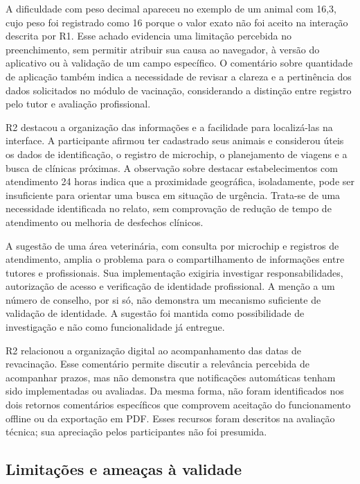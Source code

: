 \documentclass{UNESC}
\begin{document}
A dificuldade com peso decimal apareceu no exemplo de um animal com 16,3, cujo peso foi registrado como 16 porque o valor exato não foi aceito na interação descrita por R1. Esse achado evidencia uma limitação percebida no preenchimento, sem permitir atribuir sua causa ao navegador, à versão do aplicativo ou à validação de um campo específico. O comentário sobre quantidade de aplicação também indica a necessidade de revisar a clareza e a pertinência dos dados solicitados no módulo de vacinação, considerando a distinção entre registro pelo tutor e avaliação profissional.

R2 destacou a organização das informações e a facilidade para localizá-las na interface. A participante afirmou ter cadastrado seus animais e considerou úteis os dados de identificação, o registro de microchip, o planejamento de viagens e a busca de clínicas próximas. A observação sobre destacar estabelecimentos com atendimento 24 horas indica que a proximidade geográfica, isoladamente, pode ser insuficiente para orientar uma busca em situação de urgência. Trata-se de uma necessidade identificada no relato, sem comprovação de redução de tempo de atendimento ou melhoria de desfechos clínicos.

A sugestão de uma área veterinária, com consulta por microchip e registros de atendimento, amplia o problema para o compartilhamento de informações entre tutores e profissionais. Sua implementação exigiria investigar responsabilidades, autorização de acesso e verificação de identidade profissional. A menção a um número de conselho, por si só, não demonstra um mecanismo suficiente de validação de identidade. A sugestão foi mantida como possibilidade de investigação e não como funcionalidade já entregue.

R2 relacionou a organização digital ao acompanhamento das datas de revacinação. Esse comentário permite discutir a relevância percebida de acompanhar prazos, mas não demonstra que notificações automáticas tenham sido implementadas ou avaliadas. Da mesma forma, não foram identificados nos dois retornos comentários específicos que comprovem aceitação do funcionamento offline ou da exportação em PDF. Esses recursos foram descritos na avaliação técnica; sua apreciação pelos participantes não foi presumida.

\subsection{Limitações e ameaças à validade}
\end{document}
